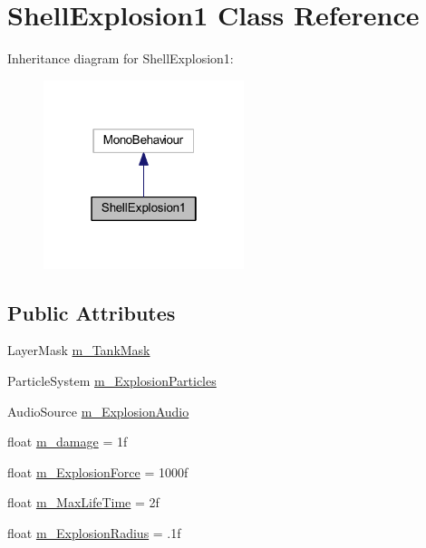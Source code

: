 \hypertarget{class_shell_explosion1}{}\section{Shell\+Explosion1 Class Reference}
\label{class_shell_explosion1}


Inheritance diagram for Shell\+Explosion1\+:
\nopagebreak
\begin{figure}[H]
\begin{center}
\leavevmode
\includegraphics[width=166pt]{class_shell_explosion1__inherit__graph}
\end{center}
\end{figure}
\subsection*{Public Attributes}
\begin{DoxyCompactItemize}
\item 
Layer\+Mask \hyperlink{class_shell_explosion1_ad67b4312d1bd3ad312cb1ea5a769d704}{m\+\_\+\+Tank\+Mask}
\item 
Particle\+System \hyperlink{class_shell_explosion1_aa5b384c6b1d733b01945980e5807ae0f}{m\+\_\+\+Explosion\+Particles}
\item 
Audio\+Source \hyperlink{class_shell_explosion1_aaad297566e8ff87ceb574d2e43f1cf50}{m\+\_\+\+Explosion\+Audio}
\item 
float \hyperlink{class_shell_explosion1_ac39941591ebb42b5ece7b3b37ebecfe7}{m\+\_\+damage} = 1f
\item 
float \hyperlink{class_shell_explosion1_a77dc688a7e90907d2e0427e0d65b594a}{m\+\_\+\+Explosion\+Force} = 1000f
\item 
float \hyperlink{class_shell_explosion1_a99238e1ac18a5fe6ea4e18dff061d380}{m\+\_\+\+Max\+Life\+Time} = 2f
\item 
float \hyperlink{class_shell_explosion1_ac825ac3c7528234f840fd532f5c87fd8}{m\+\_\+\+Explosion\+Radius} = .\+1f
\end{DoxyCompactItemize}


